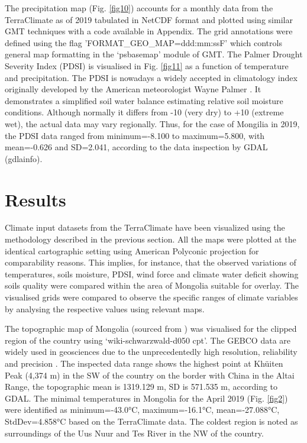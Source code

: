 \documentclass[geosciences,article,submit,pdftex,moreauthors]{Definitions/mdpi}
\begin{document}
The precipitation map (Fig. \ref{fig10}) accounts for a monthly data from the TerraClimate as of 2019 tabulated in NetCDF format and plotted using similar GMT techniques with a code available in Appendix. The grid annotations were defined using the flag 'FORMAT\_GEO\_MAP=ddd:mm:ssF' which controls general map formatting in the ‘psbasemap’ module of GMT. The Palmer Drought Severity Index (PDSI) is visualised in Fig. \ref{fig11} as a function of temperature and precipitation. The PDSI is nowadays a widely accepted in climatology index originally developed by the American meteorologist Wayne Palmer \cite{Palmer1965}. It demonstrates a simplified soil water balance estimating relative soil moisture conditions. Although normally it differs from -10 (very dry) to +10 (extreme wet), the actual data may vary regionally. Thus, for the case of Mongilia in 2019, the PDSI data ranged from minimum=-8.100 to maximum=5.800, with mean=-0.626 and SD=2.041, according to the data inspection by GDAL (gdlainfo).

\section{Results}

Climate input datasets from the TerraClimate have been visualized using the methodology described in the previous section. All the maps were plotted at the identical cartographic setting using American Polyconic projection for comparability reasons. This implies, for instance, that the observed variations of temperatures, soils moisture, PDSI, wind force and climate water deficit showing soils quality were compared within the area of Mongolia suitable for overlay. The visualised grids were compared to observe the specific ranges of climate variables by analysing the respective values using relevant maps.

The topographic map of Mongolia (sourced from \cite{GEBCO}) was visualised for the clipped region of the country using ‘wiki-schwarzwald-d050 cpt’. The GEBCO data are widely used in geosciences due to the unprecedentedly high resolution, reliability and precision \cite{Liuetal2019,Nock,Lemenkova2020m,Saito}. The inspected data range shows the highest point at Khüiten Peak (4,374 m) in the SW of the country on the border with China in the Altai Range, the topographic mean is 1319.129 m, SD is 571.535 m, according to GDAL. The minimal temperatures in Mongolia for the April 2019 (Fig. \ref{fig2}) were identified as minimum=-43.0°C, maximum=-16.1°C, mean=-27.088°C, StdDev=4.858°C based on the TerraClimate data. The coldest region is noted as surroundings of the Uus Nuur and Tes River in the NW of the country. 
\end{document}
